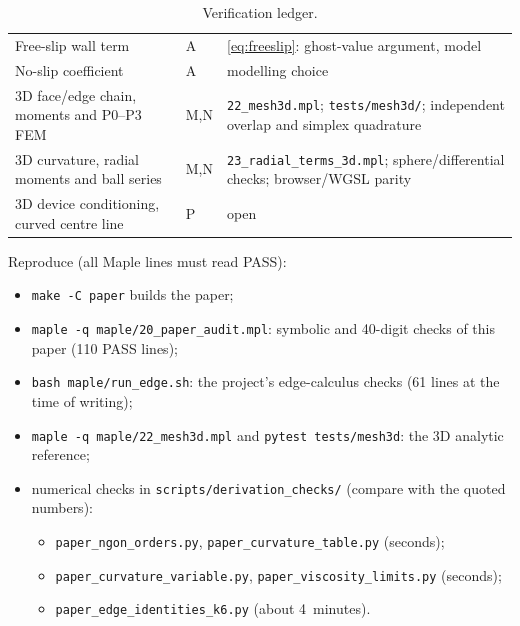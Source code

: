 \begin{table}[h]
\begin{tabular}{p{4.2cm}p{1.3cm}p{6.4cm}}
Free-slip wall term & A & \cref{eq:freeslip}: ghost-value argument, model\\
No-slip coefficient & A & modelling choice\\
3D face/edge chain, moments and P0--P3 FEM & M,N & \texttt{22\_mesh3d.mpl}; \texttt{tests/mesh3d/}; independent overlap and simplex quadrature\\
3D curvature, radial moments and ball series & M,N & \texttt{23\_radial\_terms\_3d.mpl}; sphere/differential checks; browser/WGSL parity\\
3D device conditioning, curved centre line & P & open\\
\bottomrule
\end{tabular}
\caption{Verification ledger.}\label{tab:ledger}
\end{table}

Reproduce (all Maple lines must read PASS):
\begin{itemize}
\item \texttt{make -C paper} builds the paper;
\item \texttt{maple -q maple/20\_paper\_audit.mpl}: symbolic and 40-digit checks of this paper (110 PASS lines);
\item \texttt{bash maple/run\_edge.sh}: the project's edge-calculus checks (61 lines at the time of writing);
\item \texttt{maple -q maple/22\_mesh3d.mpl} and \texttt{pytest tests/mesh3d}: the 3D analytic reference;
\item numerical checks in \texttt{scripts/derivation\_checks/} (compare with the quoted numbers):
\begin{itemize}
\item \texttt{paper\_ngon\_orders.py}, \texttt{paper\_curvature\_table.py} (seconds);
\item \texttt{paper\_curvature\_variable.py}, \texttt{paper\_viscosity\_limits.py} (seconds);
\item \texttt{paper\_edge\_identities\_k6.py} (about 4~minutes).
\end{itemize}
\end{itemize}
